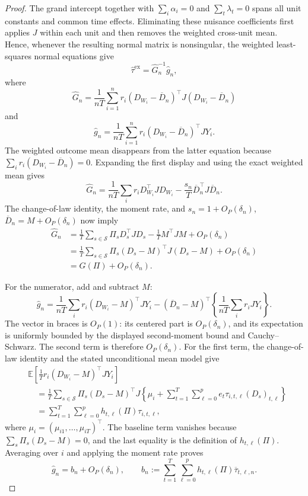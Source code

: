 \documentclass{article}
\begin{document}
\begin{proof}
The grand intercept together with \(\sum_i\alpha_i=0\) and \(\sum_t\lambda_t=0\) spans all unit constants and common time effects. Eliminating these nuisance coefficients first applies \(J\) within each unit and then removes the weighted cross-unit mean. Hence, whenever the resulting normal matrix is nonsingular, the weighted least-squares normal equations give
\[
\widehat\tau^{\mathrm{ex}}=\widehat G_n^{-1}\widehat g_n,
\]
where
\[
\widehat G_n=\frac{1}{nT}\sum_{i=1}^{n}r_i
(D_{W_i}-\overline D_n)^{\top}J(D_{W_i}-\overline D_n)
\]
and
\[
\widehat g_n=\frac{1}{nT}\sum_{i=1}^{n}r_i
(D_{W_i}-\overline D_n)^{\top}JY_i.
\]
The weighted outcome mean disappears from the latter equation because
\(\sum_i r_i(D_{W_i}-\overline D_n)=0\). Expanding the first display and using the exact weighted mean gives
\[
\widehat G_n
=\frac{1}{nT}\sum_i r_iD_{W_i}^{\top}JD_{W_i}
  -\frac{s_n}{T}\overline D_n^{\top}J\overline D_n.
\]
The change-of-law identity, the moment rate, and
\(s_n=1+O_P(\delta_n)\), \(\overline D_n=M+O_P(\delta_n)\) now imply
\[
\begin{aligned}
\widehat G_n
&=\frac1T\sum_{s\in\mathcal S}\Pi_sD_s^{\top}JD_s
  -\frac1T M^{\top}JM+O_P(\delta_n)\\
&=\frac1T\sum_{s\in\mathcal S}\Pi_s
  (D_s-M)^{\top}J(D_s-M)+O_P(\delta_n)\\
&=G(\Pi)+O_P(\delta_n).
\end{aligned}
\]

For the numerator, add and subtract \(M\):
\[
\widehat g_n
=\frac{1}{nT}\sum_i r_i(D_{W_i}-M)^{\top}JY_i
 -(\overline D_n-M)^{\top}
   \left\{\frac{1}{nT}\sum_i r_iJY_i\right\}.
\]
The vector in braces is \(O_P(1)\): its centered part is \(O_P(\delta_n)\), and its expectation is uniformly bounded by the displayed second-moment bound and Cauchy--Schwarz. The second term is therefore \(O_P(\delta_n)\). For the first term, the change-of-law identity and the stated unconditional mean model give
\[
\begin{aligned}
&\mathbb E\!\left[\frac1T r_i(D_{W_i}-M)^{\top}JY_i\right]\\
&\quad=\frac1T\sum_{s\in\mathcal S}\Pi_s(D_s-M)^{\top}J
\left\{\mu_i+\sum_{t=1}^{T}\sum_{\ell=0}^{p}
e_t\tau_{i,t,\ell}(D_s)_{t,\ell}\right\}\\
&\quad=\sum_{t=1}^{T}\sum_{\ell=0}^{p}
h_{t,\ell}(\Pi)\tau_{i,t,\ell},
\end{aligned}
\]
where \(\mu_i=(\mu_{i1},\ldots,\mu_{iT})^{\top}\). The baseline term vanishes because
\(\sum_s\Pi_s(D_s-M)=0\), and the last equality is the definition of \(h_{t,\ell}(\Pi)\). Averaging over \(i\) and applying the moment rate proves
\[
\widehat g_n=b_n+O_P(\delta_n),
\qquad
b_n:=\sum_{t=1}^{T}\sum_{\ell=0}^{p}
h_{t,\ell}(\Pi)\overline\tau_{t,\ell,n}.
\]


\end{proof}
\end{document}
